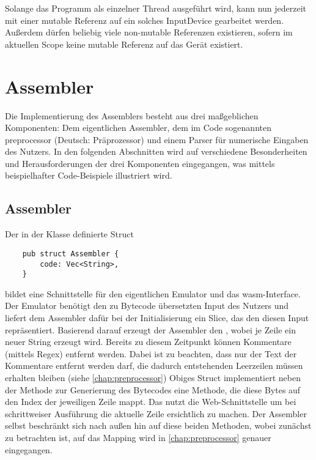 
Solange das Programm als einzelner Thread ausgeführt wird, kann nun jederzeit mit einer mutable Referenz auf ein solches InputDevice gearbeitet werden. Außerdem dürfen beliebig viele non-mutable Referenzen existieren, sofern im aktuellen Scope keine mutable Referenz auf das Gerät existiert.

\section{Assembler}

Die Implementierung des Assemblers besteht aus drei maßgeblichen Komponenten: Dem eigentlichen Assembler, dem im Code sogenannten \glqq preprocessor\grqq{} (Deutsch: Präprozessor) und einem Parser für numerische Eingaben des Nutzers. In den folgenden Abschnitten wird auf verschiedene Besonderheiten und Herausforderungen der drei Komponenten eingegangen, was mittels beispielhafter Code-Beispiele illustriert wird.

\subsection{Assembler}

Der in der Klasse  definierte Struct 
\begin{verbatim}
    pub struct Assembler {
        code: Vec<String>,
    }
\end{verbatim}
bildet eine Schnittstelle für den eigentlichen Emulator und das \ac{wasm}-Interface. Der Emulator benötigt den zu Bytecode übersetzten Input des Nutzers und liefert dem Assembler dafür bei der Initialisierung ein Slice, das den diesen Input repräsentiert. Basierend darauf erzeugt der Assembler den , wobei je Zeile ein neuer String erzeugt wird. Bereits zu diesem Zeitpunkt können Kommentare (mittels Regex) entfernt werden. Dabei ist zu beachten, dass nur der Text der Kommentare entfernt werden darf, die dadurch entstehenden Leerzeilen müssen erhalten bleiben (siehe \ref{chap:preprocessor}) Obiges Struct implementiert neben der Methode  zur Generierung des Bytecodes eine Methode, die diese Bytes auf den Index der jeweiligen Zeile mappt. Das nutzt die Web-Schnittstelle um bei schrittweiser Ausführung die aktuelle Zeile ersichtlich zu machen.
Der Assembler selbst beschränkt sich nach außen hin auf diese beiden Methoden, wobei zunächst  zu betrachten ist, auf das Mapping wird in \ref{chap:preprocessor} genauer eingegangen.

